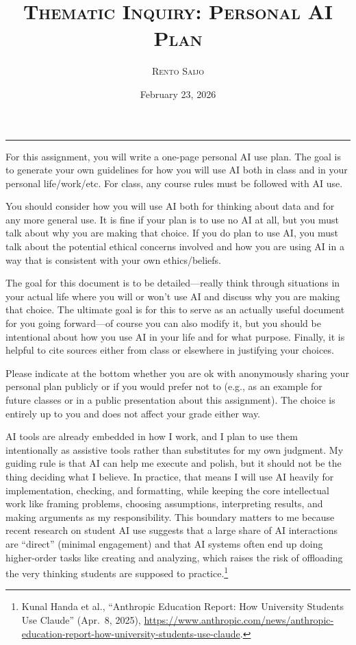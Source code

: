 \documentclass[10pt]{extarticle}
\title{\centering\Large\textsc{\textbf{Thematic Inquiry: Personal AI Plan}}}
\author{\large \textsc{Rento Saijo}}
\date{February 23, 2026}
\begin{document}
\maketitle
\thispagestyle{fancy}
\vspace{-1em}\noindent\rule{\linewidth}{0.6pt}\vspace{0.5em}

\begin{problem}
[Instructions]
For this assignment, you will write a one-page personal AI use plan. The goal is to generate your own guidelines for how you will use AI both in class and in your personal life/work/etc. For class, any course rules must be followed with AI use.

\medskip

You should consider how you will use AI both for thinking about data and for any more general use. It is fine if your plan is to use no AI at all, but you must talk about why you are making that choice. If you do plan to use AI, you must talk about the potential ethical concerns involved and how you are using AI in a way that is consistent with your own ethics/beliefs.

\medskip

The goal for this document is to be detailed---really think through situations in your actual life where you will or won’t use AI and discuss why you are making that choice. The ultimate goal is for this to serve as an actually useful document for you going forward---of course you can also modify it, but you should be intentional about how you use AI in your life and for what purpose. Finally, it is helpful to cite sources either from class or elsewhere in justifying your choices.

\medskip

Please indicate at the bottom whether you are ok with anonymously sharing your personal plan publicly or if you would prefer not to (e.g., as an example for future classes or in a public presentation about this assignment). The choice is entirely up to you and does not affect your grade either way.
\end{problem}

AI tools are already embedded in how I work, and I plan to use them intentionally as assistive tools rather than substitutes for my own judgment. My guiding rule is that AI can help me execute and polish, but it should not be the thing deciding what I believe. In practice, that means I will use AI heavily for implementation, checking, and formatting, while keeping the core intellectual work like framing problems, choosing assumptions, interpreting results, and making arguments as my responsibility. This boundary matters to me because recent research on student AI use suggests that a large share of AI interactions are ``direct'' (minimal engagement) and that AI systems often end up doing higher-order tasks like creating and analyzing, which raises the risk of offloading the very thinking students are supposed to practice.\footnote{Kunal Handa et al., ``Anthropic Education Report: How University Students Use Claude'' (Apr.\ 8, 2025), \url{https://www.anthropic.com/news/anthropic-education-report-how-university-students-use-claude}.}
\end{document}
